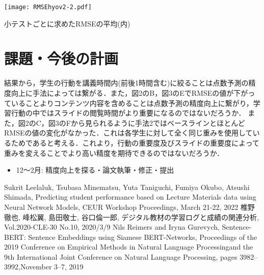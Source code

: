 \documentclass[a4j]{jarticle}
\begin{document}
\begin{table}[h]
  \centering
  \texttt{[image: RMSEhyov2-2.pdf]}
  \caption{小テストごとに求めたRMSEの平均(内)}
  \label{tb:小テストごとのRMSE(内)}
\end{table}



\section{課題・今後の計画}

結果から，学生の行動を講義時間内(前後1時間含む)に絞ることは点数予測の精度向上に手法によっては繋がる．また，図2のB，図3のEでRMSEの値が下がっていることよりコンテンツ内容を含めることは点数予測の精度向上に繋がり，学習行動の中ではスライドの閲覧時間がより重要になるのではないだろうか．
また，図2のC，図3のFから見られるように手法2ではベースラインとほとんどRMSEの値の変化がなかった．これは各学生に対して全く同じ重みを使用しているためであると考える．これより，行動の重要度及びスライドの重要度によって重みを変えることでより高い精度を期待できるのではないだろうか．

\begin{itemize}
      \item 12～2月: 精度向上を探る・論文執筆・修正・提出
\end{itemize}

\begin{thebibliography}{10}
   Sukrit Leelaluk, Tsubasa Minematsu, Yuta Taniguchi, Fumiya Okubo, Atsushi Shimada, Predicting student performance based on Lecture Materials data using Neural Network Models, CEUR Workshop Proceedings, March 21-22, 2022
  椎野徹也, 峰松翼, 島田敬士, 谷口倫一郎, デジタル教材の学習ログと成績の関連分析, Vol.2020-CLE-30 No.10, 2020/3/9
   Nils Reimers and Iryna Gurevych, Sentence-BERT: Sentence Embeddings using Siamese BERT-Networks, Proceedings of the 2019 Conference on Empirical Methods in Natural Language Processingand the 9th International Joint Conference on Natural Language Processing, pages 3982–3992,November 3–7, 2019
\end{thebibliography}
  
\end{document}
